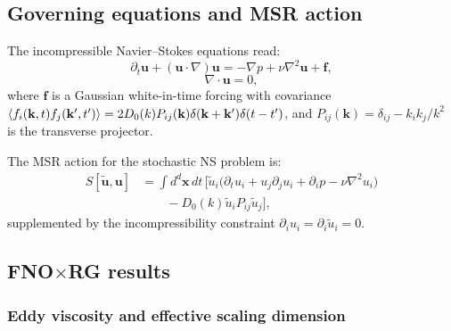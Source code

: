 \subsection{Governing equations and MSR action}

The incompressible Navier--Stokes equations read:
\begin{equation}
\partial_t \mathbf{u} + (\mathbf{u}\cdot\nabla)\mathbf{u} = -\nabla p + \nu\nabla^2\mathbf{u} + \mathbf{f},
\end{equation}
\begin{equation}
\nabla\cdot\mathbf{u} = 0,
\end{equation}
where $\mathbf{f}$ is a Gaussian white-in-time forcing with covariance $\langle f_i(\mathbf{k},t)f_j(\mathbf{k}',t') \rangle = 2D_0(k) P_{ij}(\mathbf{k})\delta(\mathbf{k}+\mathbf{k}')\delta(t-t')$, and $P_{ij}(\mathbf{k}) = \delta_{ij} - k_ik_j/k^2$ is the transverse projector.

The MSR action for the stochastic NS problem is:
{\footnotesize
\begin{equation}
\begin{aligned}
 S[\tilde{\mathbf{u}},\mathbf{u}] &= \int d^d\mathbf{x}\,dt\,\bigl[\tilde{u}_i\bigl(\partial_t u_i + u_j\partial_j u_i + \partial_i p - \nu\nabla^2 u_i\bigr) \\
 &\qquad - D_0(k)\tilde{u}_i P_{ij}\tilde{u}_j\bigr],
\end{aligned}
\end{equation}
}
supplemented by the incompressibility constraint $\partial_i u_i = \partial_i \tilde{u}_i = 0$.

\subsection{\texorpdfstring{FNO$\times$}{FNO x}RG results}

\subsubsection{Eddy viscosity and effective scaling dimension}


